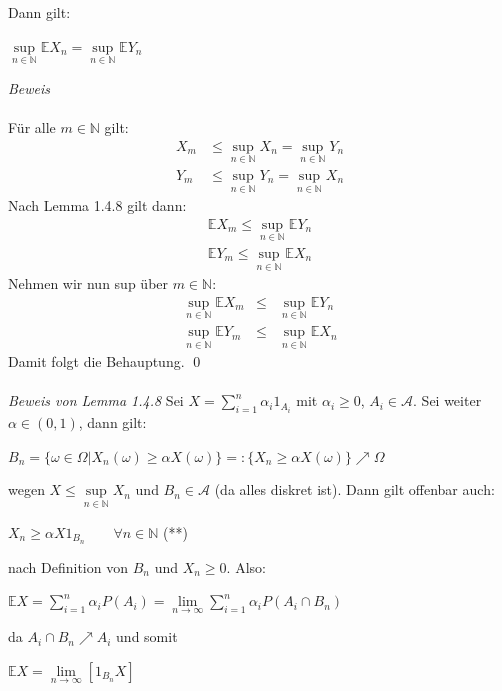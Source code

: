 \documentclass[10pt,a4paper]{report}
\numberwithin{equation}{section}
\numberwithin{figure}{section}
\theoremstyle{plain}
\theoremstyle{definition}
\theoremstyle{plain}
\theoremstyle{definition}
\theoremstyle{remark}
\theoremstyle{plain}
\theoremstyle{plain}
\theoremstyle{plain}
\theoremstyle{plain}
\theoremstyle{plain}
\newcommand{\1}{ \mathbb{1} } %
\begin{document}
Dann gilt:
\begin{center}
$\sup\limits_{n\in \mathbb{N}}\mathbb{E} X_n=\sup\limits_{n\in \mathbb{N}}\mathbb{E} Y_n$
\end{center}
\textit{Beweis}\\\\
Für alle $m\in \mathbb{N}$ gilt:
\begin{eqnarray*}
X_m&\leq\sup\limits_{n\in \mathbb{N}} X_n=\sup\limits_{n\in \mathbb{N}} Y_n\\
Y_m&\leq\sup\limits_{n\in \mathbb{N}} Y_n=\sup\limits_{n\in \mathbb{N}} X_n
\end{eqnarray*}
Nach Lemma 1.4.8 gilt dann:
\begin{eqnarray*}
\mathbb{E}X_m\leq \sup\limits_{n\in \mathbb{N}}\mathbb{E} Y_n
\end{eqnarray*}
\begin{eqnarray*}
\mathbb{E}Y_m\leq \sup\limits_{n\in \mathbb{N}}\mathbb{E} X_n
\end{eqnarray*}
Nehmen wir nun sup über $m \in \mathbb{N}$:
\begin{eqnarray*}
\sup\limits_{n\in \mathbb{N}}\mathbb{E}X_m &\leq &\sup\limits_{n\in \mathbb{N}}\mathbb{E}Y_n\\
\sup\limits_{n\in \mathbb{N}}\mathbb{E}Y_m &\leq &\sup\limits_{n\in \mathbb{N}}\mathbb{E}X_n
\end{eqnarray*}
Damit folgt die Behauptung. \qed\\\\
\textit{Beweis von Lemma 1.4.8}
Sei $X=\sum\limits_{i=1}^n\alpha_i1_{A_i}$ mit $\alpha_i \geq 0$, $A_i \in \mathcal{A}$. Sei weiter $\alpha \in (0,1)$, dann gilt:
\begin{center}
$B_n=\{\omega \in \Omega|X_n(\omega)\geq \alpha X(\omega)\}=:\{X_n\geq \alpha X(\omega)\}\nearrow \Omega$
\end{center}
wegen  $X \leq \sup\limits_{n\in \mathbb{N}} X_n$ und $B_n \in \mathcal{A}$ (da alles diskret ist). Dann gilt offenbar auch:
\begin{center}
$X_n \geq \alpha X1_{B_n} \qquad \forall n \in \mathbb{N}$ (**)
\end{center}
nach Definition von $B_n$ und $X_n\geq 0$. Also:
\begin{center}
$\mathbb{E}X=\sum\limits_{i=1}^n\alpha_i P(A_i)=\lim\limits_{n \to \infty} \sum\limits_{i=1}^n\alpha_i P(A_i\cap B_n)$
\end{center}
da $A_i\cap B_n \nearrow A_i$ und somit
\begin{center}
$\mathbb{E}X=\lim\limits_{n \to \infty}[1_{B_n}X]$
\end{center}
\end{document}
